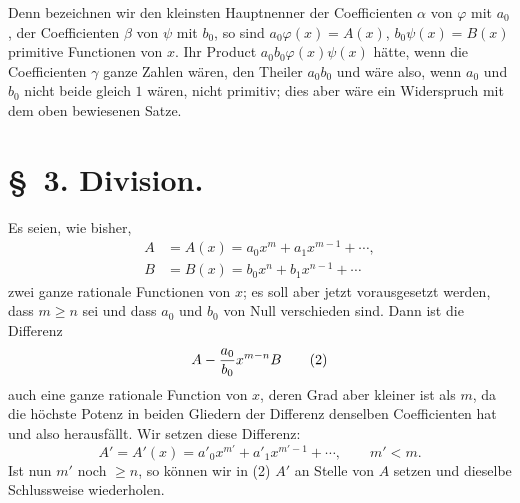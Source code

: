 \documentclass[11pt]{article}
\begin{document}
Denn bezeichnen wir den kleinsten Hauptnenner der Coefficienten $\alpha$ von $\varphi$ mit $a_0$, der Coefficienten $\beta$ von $\psi$ mit $b_0$, so sind $a_0\varphi(x)=A(x)$, $b_0\psi(x)=B(x)$ primitive Functionen von $x$. Ihr Product $a_0b_0\varphi(x)\psi(x)$ hätte, wenn die Coefficienten $\gamma$ ganze Zahlen wären, den Theiler $a_0b_0$ und wäre also, wenn $a_0$ und $b_0$ nicht beide gleich $1$ wären, nicht primitiv; dies aber wäre ein Widerspruch mit dem oben bewiesenen Satze.

\section*{\S~3. Division.}

Es seien, wie bisher,
\begin{equation}
\begin{aligned}
 A&=A(x)=a_0x^m+a_1x^{m-1}+\cdots,\\
 B&=B(x)=b_0x^n+b_1x^{n-1}+\cdots
\end{aligned}
\tag{1}
\end{equation}
zwei ganze rationale Functionen von $x$; es soll aber jetzt vorausgesetzt werden, dass $m\ge n$ sei und dass $a_0$ und $b_0$ von Null verschieden sind. Dann ist die Differenz
\begin{equation}
 A-{a_0\over b_0}x^{m-n}B
\tag{2}
\end{equation}
auch eine ganze rationale Function von $x$, deren Grad aber kleiner ist als $m$, da die höchste Potenz in beiden Gliedern der Differenz denselben Coefficienten hat und also herausfällt. Wir setzen diese Differenz:
\begin{equation}
 A'=A'(x)=a'_0x^{m'}+a'_1x^{m'-1}+\cdots,
 \qquad m'<m.
\tag{3}
\end{equation}
Ist nun $m'$ noch $\ge n$, so können wir in (2) $A'$ an Stelle von $A$ setzen und dieselbe Schlussweise wiederholen.
\end{document}
